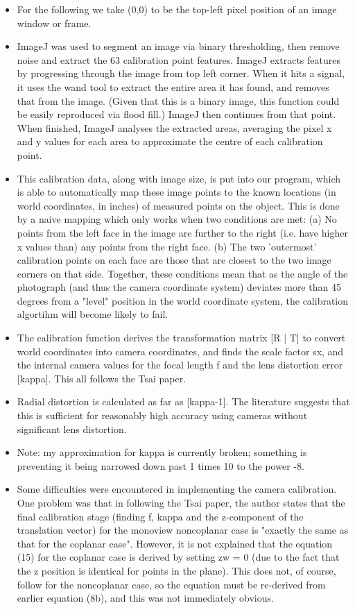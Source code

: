 \begin{itemize}
  \item For the following we take (0,0) to be the top-left pixel position of an image window or frame.
  \item ImageJ was used to segment an image via binary thresholding, then remove noise and extract the 63 calibration point features. ImageJ extracts features by progressing through the image from top left corner. When it hits a signal, it uses the wand tool to extract the entire area it has found, and removes that from the image. (Given that this is a binary image, this function could be easily reproduced via flood fill.) ImageJ then continues from that point. When finished, ImageJ analyses the extracted areas, averaging the pixel x and y values for each area to approximate the centre of each calibration point.
  \item This calibration data, along with image size, is put into our program, which is able to automatically map these image points to the known locations (in world coordinates, in inches) of measured points on the object. This is done by a naive mapping which only works when two conditions are met: (a) No points from the left face in the image are further to the right (i.e. have higher x values than) any points from the right face. (b) The two 'outermost' calibration points on each face are those that are closest to the two image corners on that side. Together, these conditions mean that as the angle of the photograph (and thus the camera coordinate system) deviates more than 45 degrees from a "level" position in the world coordinate system, the calibration algortihm will become likely to fail.
  \item The calibration function derives the transformation matrix [R | T] to convert world coordinates into camera coordinates, and finds the scale factor sx, and the internal camera values for the focal length f and the lens distortion error [kappa]. This all follows the Tsai paper.
  \item Radial distortion is calculated as far as [kappa-1]. The literature suggests that this is sufficient for reasonably high accuracy using cameras without significant lens distortion.
  \item Note: my approximation for kappa is currently broken; something is preventing it being narrowed down past 1 times 10 to the power -8.
  \item Some difficulties were encountered in implementing the camera calibration. One problem was that in following the Tsai paper, the author states that the final calibration stage (finding f, kappa and the z-component of the translation vector) for the monoview noncoplanar case is "exactly the same as that for the coplanar case". However, it is not explained that the equation (15) for the coplanar case is derived by setting zw = 0 (due to the fact that the z position is identical for points in the plane). This does not, of course, follow for the noncoplanar case, so the equation must be re-derived from earlier equation (8b), and this was not immediately obvious.
\end{itemize}

